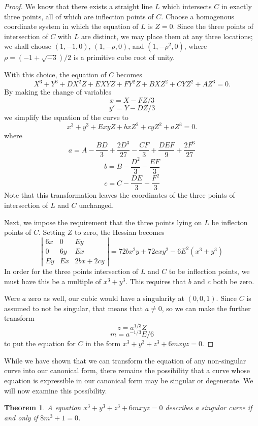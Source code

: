 \documentclass[12pt]{article}
\newtheorem{thm}{Theorem}
\begin{document}
\begin{proof}
We know that there exists a straight line $L$ which intersects 
$C$ in exactly three points, all of which are inflection points
of $C$.  Choose a homogenous coordinate system in which the 
equation of $L$ is $Z = 0$.  Since the three points of intersection
of $C$ with $L$ are distinct, we may place them at any three
locations; we shall choose
$(1, -1, 0)$, $(1, -\rho, 0)$, and $(1, -\rho^2, 0)$, where 
$\rho = (-1 + \sqrt{-3})/2$ is a primitive cube root of unity.

With this choice, the equation of $C$ becomes
\[
 X^3 + Y^3 + DX^2 Z + EXYZ + FY^2 Z + BXZ^2 + CYZ^2 + AZ^3 = 0 .
\]
By making the change of variables
\[
 x = X - FZ/3
\]
\[
 y' = Y - DZ/3
\]
we simplify the equation of the curve to
\[
 x^3 + y^3 + ExyZ + bxZ^2 + cyZ^2 + aZ^3 = 0 .
\]
where
\[
 a = A - \frac{BD}{3} + \frac{2D^3}{27} - \frac{CF}{3} + \frac{DEF}{9} +\frac{2F^3}{27}
\]
\[
 b = B - \frac{D^2}{3} - \frac{EF}{3}
\]
\[
 c = C - \frac{DE}{3} - \frac{F^2}{3}
\]
Note that this transformation leaves the coordinates of the three
points of intersection of $L$ and $C$ unchanged.

Next, we impose the requirement that the three points lying on $L$ be 
inflecton points of $C$.  Setting $Z$ to zero, the Hessian becomes
\[
 \left | \begin{matrix}
 6x & 0 & Ey \\
 0 & 6y & Ex \\
 Ey & Ex & 2bx + 2cy 
 \end{matrix} \right| =
 72 b x^2 y + 72 c x y^2 - 6E^2 (x^3 + y^3)
\]
In order for the three points intersection of $L$ and $C$ to be
inflection points, we must have this be a multiple of $x^3 + y^3$.
This requires that $b$ and $c$ both be zero.

Were $a$ zero as well, our cubic would have a singularity at $(0,0,1)$.  
Since $C$ is assumed to not be singular, that means that $a \neq 0$, so
we can make the further transform
\[
 z = a^{1/3} Z
\]
\[
 m = a^{-1/3} E / 6
\]
to put the equation for $C$ in the form $x^3 + y^3 + z^3 + 6mxyz = 0$.
\end{proof}

While we have shown that we can transform the equation of any
non-singular curve into our canonical form, there remains the
possibility that a curve whose equation is expressible in 
our canonical form may be singular or degenerate.  We will
now examine this possibility.

\begin{thm}
A equation $x^3 + y^3 + z^3 + 6mxyz = 0$ describes a singular
curve if and only if $8m^3 + 1 = 0$.
\end{thm}
\end{document}
